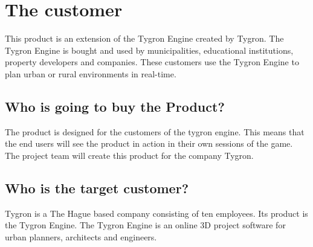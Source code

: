 \section{The customer}
This product is an extension of the Tygron Engine\cite{Tygron} created by Tygron. The Tygron Engine is bought and used by municipalities, educational institutions, property developers and companies. These customers use the Tygron Engine to plan urban or rural environments in real-time. \newline

\subsection{Who is going to buy the Product?}
The product is designed for the customers of the tygron engine. This means that the end users will see the product in action in their own sessions of the game. The project team will create this product for the company Tygron. \newline

\subsection{Who is the target customer?}
Tygron is a The Hague based company consisting of ten employees. Its product is the Tygron Engine. The Tygron Engine is an online 3D project software for urban planners, architects and engineers.
